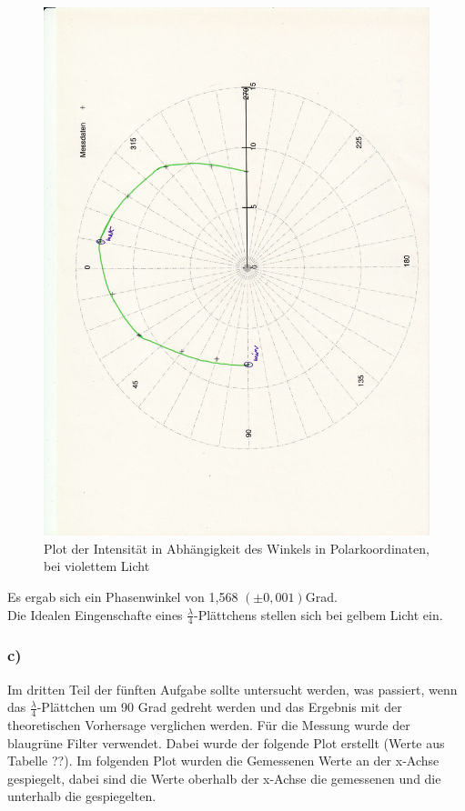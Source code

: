 \documentclass[12pt]{scrartcl}
\begin{document}
\begin{figure}[H]
\centering
    \includegraphics[scale = 0.3, angle = -90]{a_5_v.pdf}
  	\caption[Plot der Intensität in Abhängigkeit des Winkels in Polarkoordinaten, bei violettem Licht]{Plot der Intensität in Abhängigkeit des Winkels in Polarkoordinaten, bei violettem Licht}
  \label{fig:a_5_v}
\end{figure}

Es ergab sich ein Phasenwinkel von 1,568 $(\pm 0,001)$Grad.\\

Die Idealen Eingenschafte eines $\frac{\lambda}{4}$-Plättchens stellen sich bei gelbem Licht ein.

\subsubsection{c)}
Im dritten Teil der fünften Aufgabe sollte untersucht werden, was passiert, wenn das $\frac{\lambda}{4}$-Plättchen um 90 Grad gedreht werden und das Ergebnis mit der theoretischen Vorhersage verglichen werden. Für die Messung wurde der blaugrüne Filter verwendet. Dabei wurde der folgende Plot erstellt (Werte aus Tabelle ??). Im folgenden Plot wurden die Gemessenen Werte an der x-Achse gespiegelt, dabei sind die Werte oberhalb der x-Achse die gemessenen und die unterhalb die gespiegelten.
\end{document}
